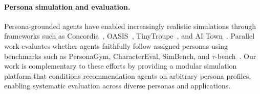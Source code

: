 \paragraph{Persona simulation and evaluation.} Persona-grounded agents have enabled increasingly realistic simulations through frameworks such as Concordia~\citep{vezhnevets2023concordia}, OASIS~\citep{yang2024oasis}, TinyTroupe~\citep{microsoft2024tinytroupe}, and AI Town~\citep{a16z2023aitown}. Parallel work evaluates whether agents faithfully follow assigned personas using benchmarks such as PersonaGym, CharacterEval, SimBench, and $\tau$-bench~\citep{samuel2024personagym,tu2024charactereval,simbench2025,yao2024taubench}. Our work is complementary to these efforts by providing a modular simulation platform that conditions recommendation agents on arbitrary persona profiles, enabling systematic evaluation across diverse personas and applications.



